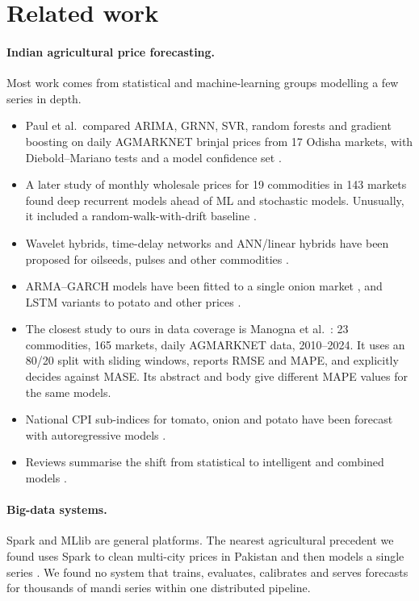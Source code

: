 \section{Related work}\label{sec:related}

\paragraph{Indian agricultural price forecasting.}
Most work comes from statistical and machine-learning groups modelling a few series in depth.
\begin{itemize}
  \item Paul et al.\ compared ARIMA, GRNN, SVR, random forests and gradient boosting on daily AGMARKNET brinjal prices
from 17 Odisha markets, with Diebold--Mariano tests and a model confidence set \cite{paul2022brinjal}.
  \item A later study of monthly wholesale prices for 19 commodities in 143 markets found deep recurrent models ahead
of ML and stochastic models. Unusually, it included a random-walk-with-drift baseline \cite{paul2025deep}.
  \item Wavelet hybrids, time-delay networks and ANN/linear hybrids have been proposed for oilseeds, pulses and other commodities
\cite{paul2021wavelet,jha2012tdnn,jha2013ann,anjoy2017pulses}.
  \item ARMA--GARCH models have been fitted to a single onion market \cite{kumar2021onion}, and LSTM variants to potato and other prices
\cite{praveenkumar2024potato,jaiswal2021lstm,manogna2021spot}.
  \item The closest study to ours in data coverage is Manogna et al.\ \cite{manogna2025deep}: 23 commodities, 165 markets, daily AGMARKNET data, 2010--2024.
    It uses an 80/20 split with sliding windows, reports RMSE and MAPE, and explicitly decides against MASE.
    Its abstract and body give different MAPE values for the same models.
  \item National CPI sub-indices for tomato, onion and potato have been forecast with autoregressive models \cite{vani2024top}.
  \item Reviews summarise the shift from statistical to intelligent and combined models \cite{sun2023review}.
\end{itemize}

\paragraph{Big-data systems.}
Spark \cite{zaharia2016spark} and MLlib \cite{meng2016mllib} are general platforms.
The nearest agricultural precedent we found uses Spark to clean multi-city prices in Pakistan and then models a single series \cite{rana2024bigdata}.
We found no system that trains, evaluates, calibrates and serves forecasts for thousands of mandi series within one distributed pipeline.

